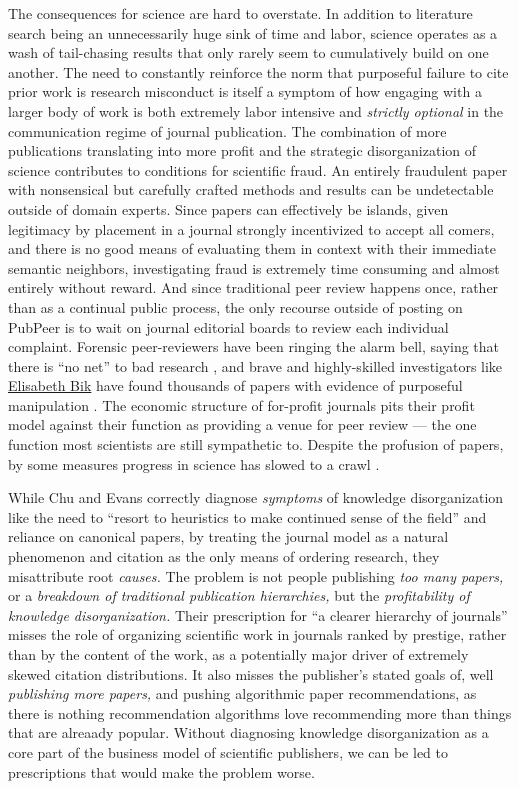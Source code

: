 \documentclass[10pt]{article}
\begin{document}
\begin{multicols}{2}
The consequences for science are hard to overstate. In addition to
literature search being an unnecessarily huge sink of time and labor,
science operates as a wash of tail-chasing results that only rarely seem
to cumulatively build on one another. The need to constantly reinforce
the norm that purposeful failure to cite prior work is research
misconduct is itself a symptom of how engaging with a larger body of
work is both extremely labor intensive and \emph{strictly optional} in
the communication regime of journal publication. The combination of more
publications translating into more profit and the strategic
disorganization of science contributes to conditions for scientific
fraud. An entirely fraudulent paper with nonsensical but carefully
crafted methods and results can be undetectable outside of domain
experts. Since papers can effectively be islands, given legitimacy by
placement in a journal strongly incentivized to accept all comers, and
there is no good means of evaluating them in context with their
immediate semantic neighbors, investigating fraud is extremely time
consuming and almost entirely without reward. And since traditional peer
review happens once, rather than as a continual public process, the only
recourse outside of posting on PubPeer is to wait on journal editorial
boards to review each individual complaint. Forensic peer-reviewers have
been ringing the alarm bell, saying that there is ``no net'' to bad
research \cite{heathersRealScandalIvermectin2021} , and brave and
highly-skilled investigators like
\href{https://scienceintegritydigest.com/}{Elisabeth Bik} have found
thousands of papers with evidence of purposeful manipulation \cite{shenMeetThisSuperspotter2020, bikPrevalenceInappropriateImage2016} .
The economic structure of for-profit journals pits their profit model
against their function as providing a venue for peer review --- the one
function most scientists are still sympathetic to. Despite the profusion
of papers, by some measures progress in science has slowed to a crawl
\cite{chuSlowedCanonicalProgress2021} .

While Chu and Evans correctly diagnose \emph{symptoms} of knowledge
disorganization like the need to ``resort to heuristics to make
continued sense of the field'' and reliance on canonical papers, by
treating the journal model as a natural phenomenon and citation as the
only means of ordering research, they misattribute root \emph{causes.}
The problem is not people publishing \emph{too many papers,} or a
\emph{breakdown of traditional publication hierarchies,} but the
\emph{profitability of knowledge disorganization.} Their prescription
for ``a clearer hierarchy of journals'' misses the role of organizing
scientific work in journals ranked by prestige, rather than by the
content of the work, as a potentially major driver of extremely skewed
citation distributions. It also misses the publisher's stated goals of,
well \emph{publishing more papers,} and pushing algorithmic paper
recommendations, as there is nothing recommendation algorithms love
recommending more than things that are alreaady popular. Without
diagnosing knowledge disorganization as a core part of the business
model of scientific publishers, we can be led to prescriptions that
would make the problem worse.


\end{multicols}
\end{document}
